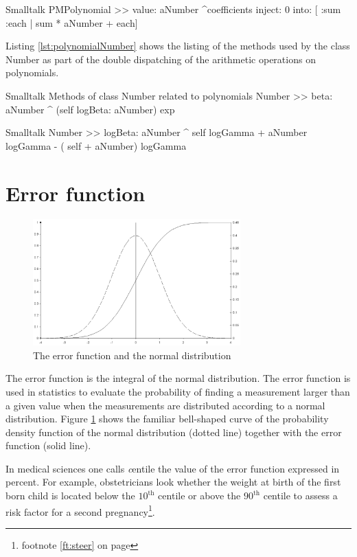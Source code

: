 \begin{displaycode}{Smalltalk}
PMPolynomial >> value: aNumber
    ^coefficients inject: 0 into: [ :sum :each | sum * aNumber + each]
\end{displaycode}

Listing \ref{lst:polynomialNumber} shows the listing of the methods
used by the class Number as part of the double dispatching of the
arithmetic operations on polynomials.

\begin{listing}[label=lst:polynomialNumber]{Smalltalk}
{Methods of class Number related to polynomials}
Number >> beta: aNumber
    ^ (self logBeta: aNumber) exp
\end{listing}
\begin{displaycode}{Smalltalk}
Number >> logBeta: aNumber
    ^ self logGamma + aNumber logGamma - ( self + aNumber) logGamma
\end{displaycode}

\section{Error function}
\label{sec:errorFunction}
\begin{figure}
\centering\includegraphics[width=8cm]{Figures/ErrorFunction}
\caption{The error function and the normal distribution}
\label{fig:errorFunction}
\end{figure}
The error function is the integral of the normal distribution. The
error function is used in statistics to evaluate the probability
of finding a measurement larger than a given value when the
measurements are distributed according to a normal distribution.
Figure \ref{sec:errorFunction} shows the familiar bell-shaped
curve of the probability density function of the normal
distribution (dotted line) together with the error function (solid
line).

In medical sciences one calls {\textsl centile} the value of the error
function expressed in percent. For example, obstetricians look
whether the weight at birth of the first born child is located
below the $10^{\mbox{th}}$ centile or above the $90^{\mbox{th}}$
centile to assess a risk factor for a second
pregnancy\footnote{\cf footnote \ref{ft:steer} on page
\pageref{ft:steer}}.

